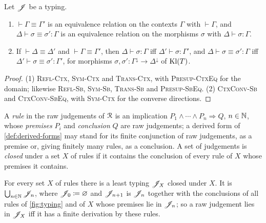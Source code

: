 \begin{lemma}\label{lem:typing}
    Let $\mathscr{J}$ be a typing.
    \begin{enumerate}
        \item $\vdash \Gamma \equiv \Gamma'$ is an equivalence relation on the contexts $\Gamma$ with $\vdash \Gamma$, and $\Delta \vdash \sigma \equiv \sigma' : \Gamma$ is an equivalence relation on the morphisms $\sigma$ with $\Delta \vdash \sigma : \Gamma$.
        \item If $\vdash \Delta \equiv \Delta'$ and $\vdash \Gamma \equiv \Gamma'$, then $\Delta \vdash \sigma : \Gamma$ iff $\Delta' \vdash \sigma : \Gamma'$, and $\Delta \vdash \sigma \equiv \sigma' : \Gamma$ iff $\Delta' \vdash \sigma \equiv \sigma' : \Gamma'$, for morphisms $\sigma, \sigma' : \Gamma^{\downarrow} \to \Delta^{\downarrow}$ of $\mathrm{Kl}(T)$.
    \end{enumerate}
\end{lemma}

\begin{proof}
    (1) \textsc{Refl-Ctx}, \textsc{Sym-Ctx} and \textsc{Trans-Ctx}, with \textsc{Presup-CtxEq} for the domain; likewise \textsc{Refl-Sb}, \textsc{Sym-Sb}, \textsc{Trans-Sb} and \textsc{Presup-SbEq}. (2) \textsc{CtxConv-Sb} and \textsc{CtxConv-SbEq}, with \textsc{Sym-Ctx} for the converse directions.
\end{proof}

\begin{definition}\label{def:rule}
    A \emph{rule} in the raw judgements of $\mathcal{R}$ is an implication $P_1 \wedge \cdots \wedge P_n \Rightarrow Q$, $n \in \mathbb{N}$, whose \emph{premises} $P_i$ and \emph{conclusion} $Q$ are raw judgements; a derived form of \cref{def:derived-forms} may stand for its finite conjunction of raw judgements, as a premise or, giving finitely many rules, as a conclusion. A set of judgements is \emph{closed} under a set $X$ of rules if it contains the conclusion of every rule of $X$ whose premises it contains.
\end{definition}

\begin{proposition}\label{prop:lattice}
    For every set $X$ of rules there is a least typing $\mathscr{J}_X$ closed under $X$. It is $\bigcup_{n \in \mathbb{N}} \mathscr{J}_n$, where $\mathscr{J}_0 \coloneqq \varnothing$ and $\mathscr{J}_{n+1}$ is $\mathscr{J}_n$ together with the conclusions of all rules of \cref{fig:typing} and of $X$ whose premises lie in $\mathscr{J}_n$; so a raw judgement lies in $\mathscr{J}_X$ iff it has a finite derivation by these rules.
\end{proposition}

